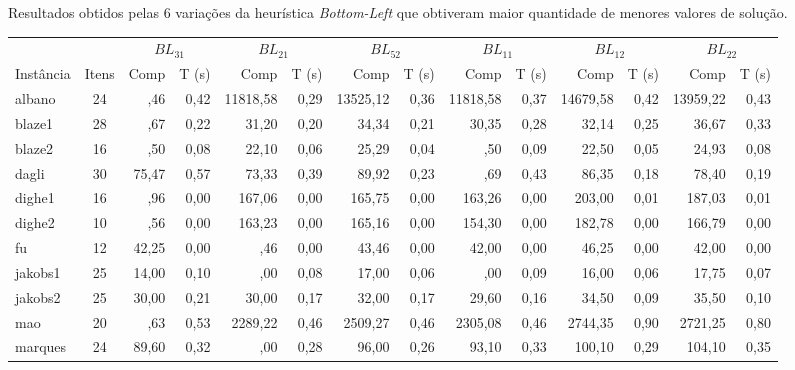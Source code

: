 \begin{adjustwidth}{-2cm}{-2.5 cm}\centering\begin{threeparttable}\centering
\renewcommand{\arraystretch}{1.2}%
    \caption{Resultados obtidos pelas 6 variações da heurística \textit{Bottom-Left} que obtiveram maior quantidade de menores valores de solução.}
    \scriptsize{
        \begin{tabular}{|l|c|rr|rr|rr|rr|rr|rr|}\hline
        \multicolumn{1}{|c|}{} & \multicolumn{1}{c|}{} &  \multicolumn{2}{c|}{$BL_{31}$} & \multicolumn{2}{c|}{$BL_{21}$} & \multicolumn{2}{c|}{$BL_{52}$} &
        \multicolumn{2}{c|}{$BL_{11}$} &
        \multicolumn{2}{c|}{$BL_{12}$} &
        \multicolumn{2}{c|}{$BL_{22}$}\\
            Instância &Itens &Comp &T (s) &Comp &T (s) &Comp &T (s) &Comp &T (s) &Comp &T (s) &Comp &T (s) \\\hline
            albano &24  &\lgray11376,46 &0,42  &11818,58 &0,29  &13525,12 &0,36  &11818,58 &0,37  &14679,58 &0,42  &13959,22 &0,43 \\
            blaze1 &28  &\lgray28,67 &0,22  &31,20 &0,20  &34,34 &0,21  &30,35 &0,28  &32,14 &0,25  &36,67 &0,33 \\
            blaze2 &16  &\lgray21,50 &0,08  &22,10 &0,06  &25,29 &0,04  &\lgray21,50 &0,09  &22,50 &0,05  &24,93 &0,08 \\
            dagli &30  &75,47 &0,57  &73,33 &0,39  &89,92 &0,23  &\lgray67,69 &0,43  &86,35 &0,18  &78,40 &0,19 \\
            dighe1 &16  &\lgray146,96 &0,00  &167,06 &0,00  &165,75 &0,00  &163,26 &0,00  &203,00 &0,01  &187,03 &0,01 \\
            dighe2 &10  &\lgray145,56 &0,00  &163,23 &0,00  &165,16 &0,00  &154,30 &0,00  &182,78 &0,00  &166,79 &0,00 \\
            fu &12  &42,25 &0,00  &\lgray36,46 &0,00  &43,46 &0,00  &42,00 &0,00  &46,25 &0,00  &42,00 &0,00 \\
            jakobs1 &25  &14,00 &0,10  &\lgray13,00 &0,08  &17,00 &0,06  &\lgray13,00 &0,09  &16,00 &0,06  &17,75 &0,07 \\
            jakobs2 &25  &30,00 &0,21  &30,00 &0,17  &32,00 &0,17  &29,60 &0,16  &34,50 &0,09  &35,50 &0,10 \\
            mao &20  &\lgray2119,63 &0,53  &2289,22 &0,46  &2509,27 &0,46  &2305,08 &0,46  &2744,35 &0,90  &2721,25 &0,80 \\
            marques &24  &89,60 &0,32  &\lgray87,00 &0,28  &96,00 &0,26  &93,10 &0,33  &100,10 &0,29  &104,10 &0,35 \\

\end{tabular}}
\end{threeparttable}
\end{adjustwidth}
